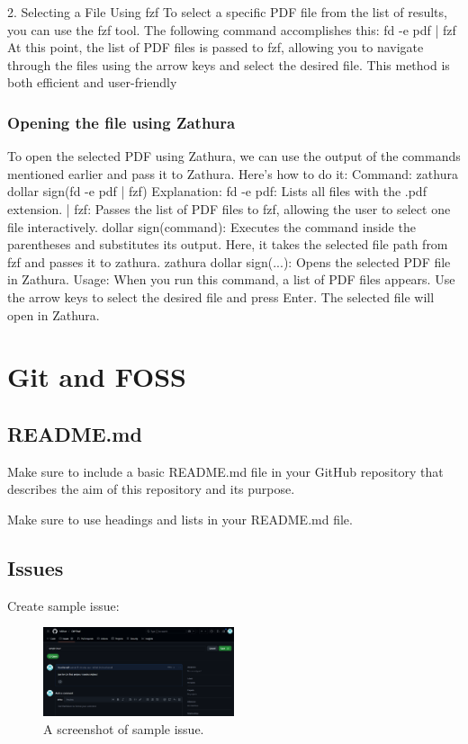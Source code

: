 \documentclass[12pt]{article}
\begin{document}
2. Selecting a File Using fzf
To select a specific PDF file from the list of results, you can use the fzf tool. The following command accomplishes this:
fd -e pdf | fzf
At this point, the list of PDF files is passed to fzf, allowing you to navigate through the files using the arrow keys and select the desired file. This method is both efficient and user-friendly

\subsubsection{Opening the file using Zathura}
To open the selected PDF using Zathura, we can use the output of the commands mentioned earlier and pass it to Zathura. Here’s how to do it:
Command:
zathura dollar sign(fd -e pdf | fzf)
Explanation:
fd -e pdf: Lists all files with the .pdf extension.
| fzf: Passes the list of PDF files to fzf, allowing the user to select one file interactively.
dollar sign(command): Executes the command inside the parentheses and substitutes its output. Here, it takes the selected file path from fzf and passes it to zathura.
zathura dollar sign(...): Opens the selected PDF file in Zathura.
Usage:
When you run this command, a list of PDF files appears. Use the arrow keys to select the desired file and press Enter. The selected file will open in Zathura.

\section{Git and FOSS}
\subsection{README.md}
Make sure to include a basic README.md file in your GitHub repository that describes the aim of this repository and its purpose.

Make sure to use headings and lists in your README.md file.

\subsection{Issues}
Create sample issue:
\begin{figure}[htbp]
    \centering
    \includegraphics[width=0.5\textwidth]{pic/Screenshot 2025-01-19 235151.png}
    \caption{A screenshot of sample issue.}
    \label{fig:issue}
\end{figure}
\end{document}

